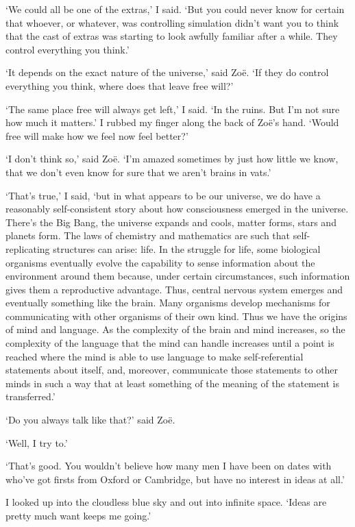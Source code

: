 `We could all be one of the extras,' I said. `But you could never
know for certain that whoever, or whatever, was controlling
simulation didn't want you to think that the cast of extras was
starting to look awfully familiar after a while. They control
everything you think.'

`It depends on the exact nature of the universe,' said Zoë. `If
they do control everything you think, where does that leave free
will?'

`The same place free will always get left,' I said. `In the ruins.
But I'm not sure how much it matters.' I rubbed my finger along the
back of Zoë's hand. `Would free will make how we feel now feel
better?'

`I don't think so,' said Zoë. `I'm amazed sometimes by just how
little we know, that we don't even know for sure that we aren't
brains in vats.'

`That's true,' I said, `but in what appears to be our universe, we
do have a reasonably self-consistent story about how consciousness
emerged in the universe. There's the Big Bang, the universe expands
and cools, matter forms, stars and planets form. The laws of
chemistry and mathematics are such that self-replicating structures
can arise: life. In the struggle for life, some biological organisms
eventually evolve the capability to sense information about the
environment around them because, under certain circumstances, such
information gives them a reproductive advantage. Thus, central
nervous system emerges and eventually something like the brain. Many
organisms develop mechanisms for communicating with other organisms
of their own kind. Thus we have the origins of mind and language. As
the complexity of the brain and mind increases, so the complexity of
the language that the mind can handle increases until a point is
reached where the mind is able to use language to make
self-referential statements about itself, and, moreover, communicate
those statements to other minds in such a way that at least
something of the meaning of the statement is transferred.'

`Do you always talk like that?' said Zoë.

`Well, I try to.'

`That's good. You wouldn't believe how many men I have been on dates
with who've got firsts from Oxford or Cambridge, but have no
interest in ideas at all.'

I looked up into the cloudless blue sky and out into infinite space.
`Ideas are pretty much want keeps me going.'


